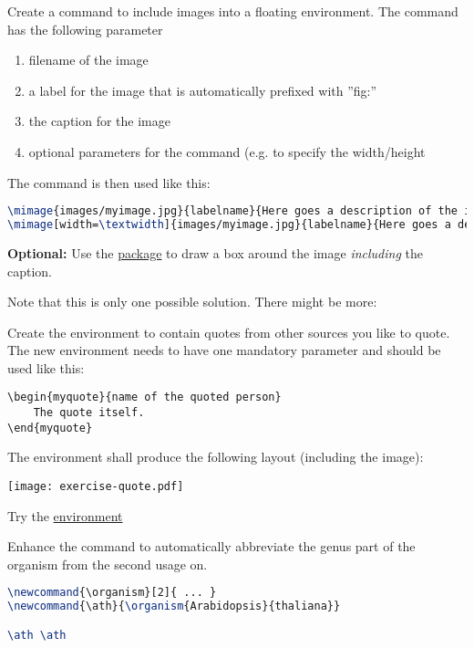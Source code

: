 \question Create a command  to include images into a floating
environment. The command has the following parameter
\begin{enumerate}
	\item filename of the image
	\item a label for the image that is automatically prefixed with ''fig:''
	\item the caption for the image
	\item optional parameters for the  command (e.g. to
		specify the width/height
\end{enumerate}
The command is then used like this:
\begin{lstlisting}[language=TeX]
\mimage{images/myimage.jpg}{labelname}{Here goes a description of the image}
\mimage[width=\textwidth]{images/myimage.jpg}{labelname}{Here goes a description of the image}
\end{lstlisting}

\textbf{Optional:} Use the
\href{http://www.ctan.org/pkg/fancybox}{ package} to draw a box around the image
\emph{including} the caption.

\begin{solution}
	Note that this is only one possible solution. There might be more:
\end{solution}


\question Create the  environment to contain quotes from other
sources you like to quote. The new environment needs to have one mandatory
parameter and should be used like this:
\begin{lstlisting}
\begin{myquote}{name of the quoted person}
	The quote itself.
\end{myquote}
\end{lstlisting}

The environment shall produce the following layout (including the image):
\begin{center}
	\texttt{[image: exercise-quote.pdf]}
\end{center}

{\small Try the \href{http://www.golatex.de/wiki/index.php?title=minipage}{
environment}}
\begin{solution}
\end{solution}


\question Enhance the  command to automatically abbreviate the
genus part of the organism from the second usage on.
\begin{lstlisting}[language=TeX]
\newcommand{\organism}[2]{ ... }
\newcommand{\ath}{\organism{Arabidopsis}{thaliana}}

\ath \ath
\end{lstlisting}


